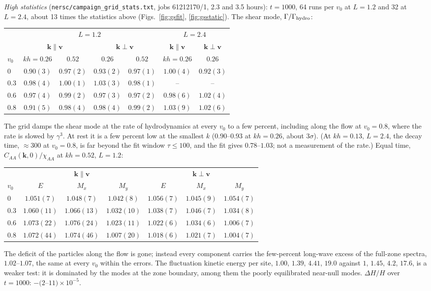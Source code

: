 \documentclass[11pt,aps,preprint,nofootinbib,superscriptaddress,tightenlines]{revtex4-2}
\begin{document}
\emph{High statistics} (\texttt{nersc/campaign\_grid\_stats.txt}, jobs 61212170/1, 2.3 and 3.5 hours): $t=1000$,
64 runs per $v_0$ at $L=1.2$ and 32 at $L=2.4$, about 13 times the statistics above
(Figs.~\ref{fig:gsfit}, \ref{fig:gsstatic}).  The shear mode, $\Gamma/\Gamma_{\rm hydro}$:
\begin{center}
\begin{tabular}{lcccccc}
\hline
 & \multicolumn{4}{c}{$L=1.2$} & \multicolumn{2}{c}{$L=2.4$} \\
 & \multicolumn{2}{c}{$\bm k\parallel\bm v$} & \multicolumn{2}{c}{$\bm k\perp\bm v$} & $\bm k\parallel\bm v$ & $\bm k\perp\bm v$ \\
$v_0$ & $kh=0.26$ & $0.52$ & $0.26$ & $0.52$ & $kh=0.26$ & $0.26$ \\ \hline
0 & $0.90(3)$ & $0.97(2)$ & $0.93(2)$ & $0.97(1)$ & $1.00(4)$ & $0.92(3)$ \\
0.3 & $0.98(4)$ & $1.00(1)$ & $1.03(3)$ & $0.98(1)$ & -- & -- \\
0.6 & $0.97(4)$ & $0.99(2)$ & $0.97(3)$ & $0.97(2)$ & $0.98(6)$ & $1.02(4)$ \\
0.8 & $0.91(5)$ & $0.98(4)$ & $0.98(4)$ & $0.99(2)$ & $1.03(9)$ & $1.02(6)$ \\
\hline
\end{tabular}
\end{center}
The grid damps the shear mode at the rate of hydrodynamics at every $v_0$ to a few percent, including along
the flow at $v_0=0.8$, where the rate is slowed by $\gamma^3$.  At rest it is a few percent low at the smallest $k$
($0.90$--$0.93$ at $kh=0.26$, about $3\sigma$).  (At $kh=0.13$, $L=2.4$, the decay time, $\approx300$ at $v_0=0.8$, is far beyond
the fit window $\tau\le100$, and the fit gives $0.78$--$1.03$; not a measurement of the rate.)  Equal time,
$C_{AA}(\bm k,0)/\chi_{AA}$ at $kh=0.52$, $L=1.2$:
\begin{center}
\begin{tabular}{lcccccc}
\hline
 & \multicolumn{3}{c}{$\bm k\parallel\bm v$} & \multicolumn{3}{c}{$\bm k\perp\bm v$} \\
$v_0$ & $E$ & $M_x$ & $M_y$ & $E$ & $M_x$ & $M_y$ \\ \hline
0 & $1.051(7)$ & $1.048(7)$ & $1.042(8)$ & $1.056(7)$ & $1.045(9)$ & $1.054(7)$ \\
0.3 & $1.060(11)$ & $1.066(13)$ & $1.032(10)$ & $1.038(7)$ & $1.046(7)$ & $1.034(8)$ \\
0.6 & $1.073(22)$ & $1.076(24)$ & $1.023(11)$ & $1.022(6)$ & $1.034(6)$ & $1.006(7)$ \\
0.8 & $1.072(44)$ & $1.074(46)$ & $1.007(20)$ & $1.018(6)$ & $1.021(7)$ & $1.004(7)$ \\
\hline
\end{tabular}
\end{center}
The deficit of the particles along the flow is gone; instead every component carries the few-percent
long-wave excess of the full-zone spectra, $1.02$--$1.07$, the same at every $v_0$ within the errors.  The
fluctuation kinetic energy per site, $1.00$, $1.39$, $4.41$, $19.0$ against $1$, $1.45$, $4.2$, $17.6$, is a weaker test:
it is dominated by the modes at the zone boundary, among them the poorly equilibrated near-null modes.
$\Delta H/H$ over $t=1000$: $-(2$--$11)\times10^{-5}$.
\end{document}
